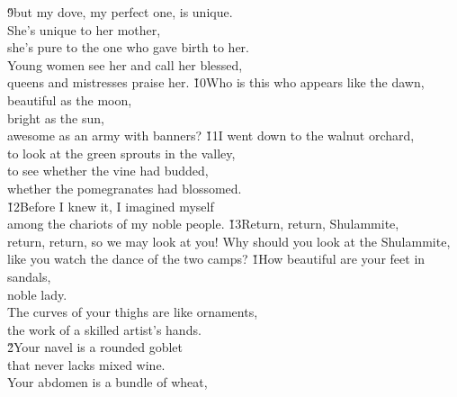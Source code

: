 \begin{poetry}
\poeml \v{9}but my dove, my perfect one, is unique. \\
\poeml She's unique to her mother, \\
\poemll    she's pure to the one who gave birth to her. \\
\poeml Young women see her and call her blessed, \\
\poemll    queens and mistresses praise her.
\poeml \v{10}Who is this who appears like the dawn, \\
\poemll    beautiful as the moon, \\
\poeml bright as the sun, \\
\poemll    awesome as an army with banners?
\poeml \v{11}I went down to the walnut orchard, \\
\poemll    to look at the green sprouts in the valley, \\
\poeml to see whether the vine had budded, \\
\poemll    whether the pomegranates had blossomed. \\
\poeml \v{12}Before I knew it, I imagined myself \\
\poemll    among the chariots of my noble people.
\poeml \v{13}Return, return, Shulammite, \\
\poemll    return, return, so we may look at you!
\poeml Why should you look at the Shulammite, \\
\poemll    like you watch the dance of the two camps?
\poeml {}
\v{1}How beautiful are your feet in sandals, \\
\poeml noble lady. \\
\poeml The curves of your thighs are like ornaments, \\
\poemll    the work of a skilled artist's hands. \\
\poeml \v{2}Your navel is a rounded goblet \\
\poemll    that never lacks mixed wine. \\
\poeml Your abdomen is a bundle of wheat, \\

\end{poetry}
